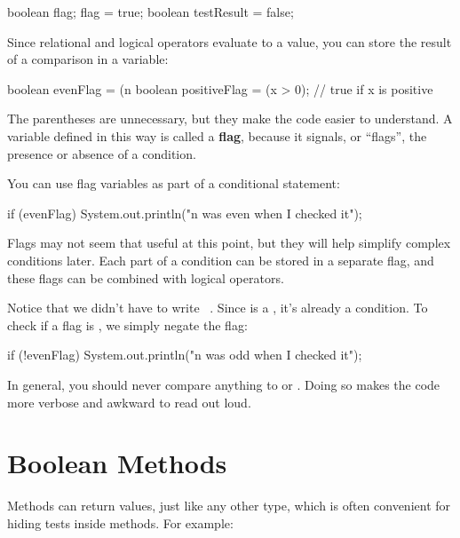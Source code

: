 \begin{code}
boolean flag;
flag = true;
boolean testResult = false;
\end{code}


Since relational and logical operators evaluate to a  value, you can store the result of a comparison in a variable:

\begin{code}
boolean evenFlag = (n %
boolean positiveFlag = (x > 0);     // true if x is positive
\end{code}


The parentheses are unnecessary, but they make the code easier to understand.
A variable defined in this way is called a {\bf flag}, because it signals, or ``flags'', the presence or absence of a condition.

You can use flag variables as part of a conditional statement:

\begin{code}
if (evenFlag) {
    System.out.println("n was even when I checked it");
}
\end{code}

Flags may not seem that useful at this point, but they will help simplify complex conditions later.
Each part of a condition can be stored in a separate flag, and these flags can be combined with logical operators.

Notice that we didn't have to write ~.
Since  is a , it's already a condition.
To check if a flag is , we simply negate the flag:

\begin{code}
if (!evenFlag) {
    System.out.println("n was odd when I checked it");
}
\end{code}

In general, you should never compare anything to  or .
Doing so makes the code more verbose and awkward to read out loud.


\section{Boolean Methods}
\label{boolmeth}


Methods can return  values, just like any other type, which is often convenient for hiding tests inside methods.
For example:


